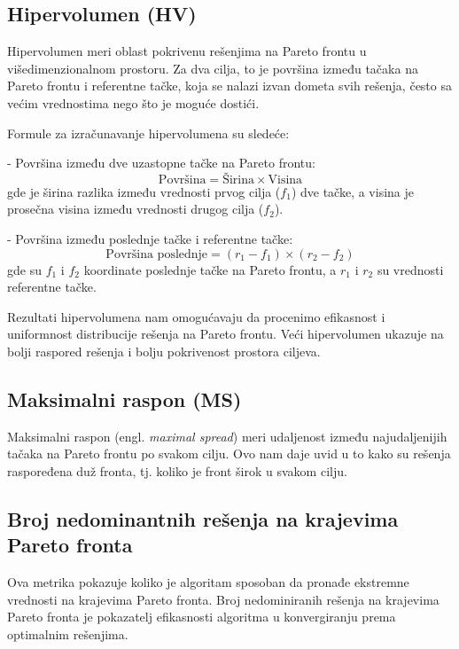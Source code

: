 \documentclass[12pt]{article}
\begin{document}
\subsection{Hipervolumen (HV)}
Hipervolumen meri oblast pokrivenu rešenjima na Pareto frontu u višedimenzionalnom prostoru. Za dva cilja, to je površina između tačaka na Pareto frontu i referentne tačke, koja se nalazi izvan dometa svih rešenja, često sa većim vrednostima nego što je moguće dostići.
   
Formule za izračunavanje hipervolumena su sledeće:

- Površina između dve uzastopne tačke na Pareto frontu:
  \[
  \text{Površina} = \text{Širina} \times \text{Visina}
  \]
  gde je širina razlika između vrednosti prvog cilja (\( f_1 \)) dve tačke, a visina je prosečna visina između vrednosti drugog cilja (\( f_2 \)).

- Površina između poslednje tačke i referentne tačke:
  \[
  \text{Površina poslednje} = (r_1 - f_1) \times (r_2 - f_2)
  \]
  gde su \( f_1 \) i \( f_2 \) koordinate poslednje tačke na Pareto frontu, a \( r_1 \) i \( r_2 \) su vrednosti referentne tačke.

Rezultati hipervolumena nam omogućavaju da procenimo efikasnost i uniformnost distribucije rešenja na Pareto frontu. Veći hipervolumen ukazuje na bolji raspored rešenja i bolju pokrivenost prostora ciljeva.


\subsection{Maksimalni raspon (MS)}
Maksimalni raspon (engl. \textit{maximal spread}) meri udaljenost između najudaljenijih tačaka na Pareto frontu po svakom cilju. Ovo nam daje uvid u to kako su rešenja raspoređena duž fronta, tj. koliko je front širok u svakom cilju.

 	
 	
\subsection{Broj nedominantnih rešenja na krajevima Pareto fronta}
Ova metrika pokazuje koliko je algoritam sposoban da pronađe ekstremne vrednosti na krajevima Pareto fronta. Broj nedominiranih rešenja na krajevima Pareto fronta je pokazatelj efikasnosti algoritma u konvergiranju prema optimalnim rešenjima.
\end{document}
